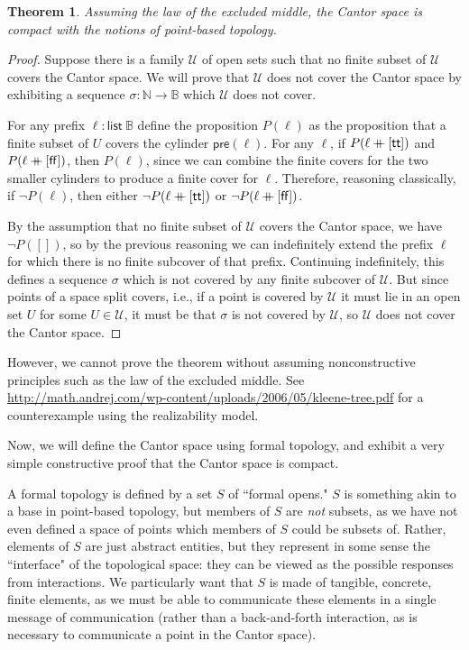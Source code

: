 \documentclass{article}           %
\newtheorem{theorem}{Theorem}
\newcommand{\nat}{\mathbb{N}}
\newcommand{\bool}{\mathbb{B}}
\newcommand{\List}[1]{\mathsf{list}\ {#1}}
\newcommand{\cat}{\ensuremath{\mathbin{+\mkern-10mu+}}}
\begin{document}
\begin{theorem}
\label{nonconstructivecompact}
Assuming the law of the excluded middle, the Cantor space is compact with the notions of point-based topology.
\end{theorem}
\begin{proof}
Suppose there is a family $\mathcal{U}$ of open sets such that no finite subset of $\mathcal{U}$ covers the Cantor space. We will prove that $\mathcal{U}$ does not cover the Cantor space by exhibiting a sequence $\sigma : \nat \to \bool$ which $\mathcal{U}$ does not cover.

For any prefix $\ell : \List{\bool}$ define the proposition $P(\ell)$ as the proposition that a finite subset of $U$ covers the cylinder $\mathsf{pre}(\ell)$. For any $\ell$, if $P(\ell \cat [\mathsf{tt}])$ and $P(\ell \cat [\mathsf{ff}])$, then $P(\ell)$, since we can combine the finite covers for the two smaller cylinders to produce a finite cover for $\ell$. Therefore, reasoning classically, if $\neg P(\ell)$, then either $\neg P(\ell \cat [\mathsf{tt}])$ or $\neg P(\ell \cat [\mathsf{ff}])$.

By the assumption that no finite subset of $\mathcal{U}$ covers the Cantor space, we have $\neg P([])$, so by the previous reasoning we can indefinitely extend the prefix $\ell$ for which there is no finite subcover of that prefix. Continuing indefinitely, this defines a sequence $\sigma$ which is not covered by any finite subcover of $\mathcal{U}$. But since points of a space split covers, i.e., if a point is covered by $\mathcal{U}$ it must lie in an open set $U$ for some $U \in \mathcal{U}$, it must be that $\sigma$ is not covered by $\mathcal{U}$, so $\mathcal{U}$ does not cover the Cantor space.
\end{proof}

However, we cannot prove the theorem without assuming nonconstructive principles such as the law of the excluded middle. See \url{http://math.andrej.com/wp-content/uploads/2006/05/kleene-tree.pdf} for a counterexample using the realizability model.

Now, we will define the Cantor space using formal topology, and exhibit a very simple constructive proof that the Cantor space is compact.

A formal topology is defined by a set $S$ of ``formal opens." $S$ is something akin to a base in point-based topology, but members of $S$ are \emph{not} subsets, as we have not even defined a space of points which members of $S$ could be subsets of. Rather, elements of $S$ are just abstract entities, but they represent in some sense the ``interface" of the topological space: they can be viewed as the possible responses from interactions. We particularly want that $S$ is made of tangible, concrete, finite elements, as we must be able to communicate these elements in a single message of communication (rather than a back-and-forth interaction, as is necessary to communicate a point in the Cantor space).
\end{document}
